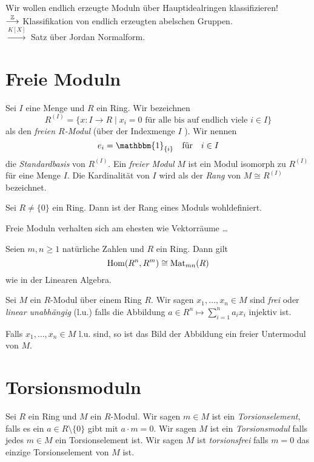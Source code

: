 Wir wollen endlich erzeugte Moduln über Hauptidealringen klassifizieren!\\
$\overset{\mathbb{Z}}{\longrightarrow}$ Klassifikation von endlich erzeugten abelschen Gruppen.\\
$\overset{K[X]}{\longrightarrow}$ Satz über Jordan Normalform.

\section{Freie Moduln}

\begin{definition}
	Sei $I$ eine Menge und $R$ ein Ring. Wir bezeichnen
	\[
		R^{(I)} = \{x : I \to R \mid x_{i} = 0 \text{ für alle bis auf endlich viele } i \in I\} 
	\] 
	als den \emph{freien $R$-Modul} (über der Indexmenge $I$ ). Wir nennen
	\[
		e_{i} = \mathbbm{1}_{\{i\}} \qq{für} i \in I
	\]
	die \emph{Standardbasis} von $R^{(I)}$.
	Ein \emph{freier Modul} $M$ ist ein Modul isomorph zu $R^{(I)}$ für eine Menge $I$.
	Die Kardinalität von $I$ wird als der \emph{Rang} von $M \cong R^{(I)}$ bezeichnet.
\end{definition}

\begin{lemma}
	Sei $R \neq \{0\} $ ein Ring. Dann ist der Rang eines Moduls wohldefiniert.
\end{lemma}


\begin{claim}
	Freie Moduln verhalten sich am ehesten wie Vektorräume \ldots
\end{claim}

\begin{proposition}
	Seien $m,n \geq 1$ natürliche Zahlen und $R$ ein Ring. Dann gilt
	\[
		\operatorname{Hom}(R^{n},R^{m}) \cong \operatorname{Mat}_{mn}(R)
	\] 
	wie in der Linearen Algebra.
\end{proposition}


\begin{definition}
	Sei $M$ ein $ R$-Modul über einem Ring $R$. Wir sagen $x_1,\ldots,x_{n} \in M$ sind \emph{frei} oder \emph{linear unabhängig} (l.u.) falls die Abbildung
	$a \in R^{n} \mapsto \sum_{i = 1}^{n} a_{i} x_{i}$ injektiv ist.

	Falls $x_1,\ldots,x_{n} \in M$ l.u. sind, so ist das Bild der Abbildung ein freier Untermodul von $M$.
\end{definition}

\section{Torsionsmoduln}
\begin{definition}
	Sei $R$ ein Ring und $M$ ein $R$-Modul. Wir sagen $m \in M$ ist ein \emph{Torsionselement}, falls es ein $a \in R \setminus \{0\} $ gibt
	mit $a \cdot m = 0$. Wir sagen $M$ ist ein \emph{Torsionsmodul} falls jedes $m \in M$ ein Torsionselement ist.
	Wir sagen $M$ ist \emph{torsionsfrei} falls $m = 0$ das einzige Torsionselement von $M$ ist.
\end{definition}


